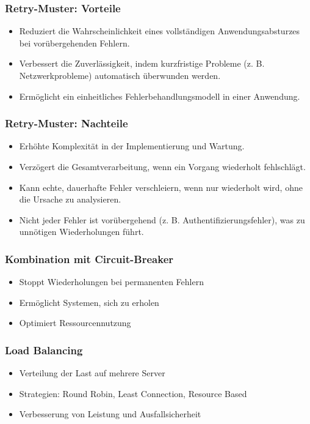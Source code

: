 \begin{frame}
    \frametitle{Retry-Muster: Vorteile}
    \begin{itemize}
    \item Reduziert die Wahrscheinlichkeit eines vollständigen Anwendungsabsturzes bei vorübergehenden Fehlern.
    \item Verbessert die Zuverlässigkeit, indem kurzfristige Probleme (z. B. Netzwerkprobleme) automatisch überwunden werden.
    \item Ermöglicht ein einheitliches Fehlerbehandlungsmodell in einer Anwendung.
\end{itemize}
\end{frame}

\begin{frame}
    \frametitle{Retry-Muster: Nachteile}
    \begin{itemize}
        \item Erhöhte Komplexität in der Implementierung und Wartung.
        \item Verzögert die Gesamtverarbeitung, wenn ein Vorgang wiederholt fehlschlägt.
        \item Kann echte, dauerhafte Fehler verschleiern, wenn nur wiederholt wird, ohne die Ursache zu analysieren.
        \item Nicht jeder Fehler ist vorübergehend (z. B. Authentifizierungsfehler), was zu unnötigen Wiederholungen führt.
    \end{itemize}
\end{frame}

\begin{frame}
    \frametitle{Kombination mit Circuit-Breaker}
    \begin{itemize}
        \item Stoppt Wiederholungen bei permanenten Fehlern
        \item Ermöglicht Systemen, sich zu erholen
        \item Optimiert Ressourcennutzung
    \end{itemize}
\end{frame}


\begin{frame}
    \frametitle{Load Balancing}
    \begin{itemize}
        \item Verteilung der Last auf mehrere Server
        \item Strategien: Round Robin, Least Connection, Resource Based
        \item Verbesserung von Leistung und Ausfallsicherheit
    \end{itemize}
\end{frame}

